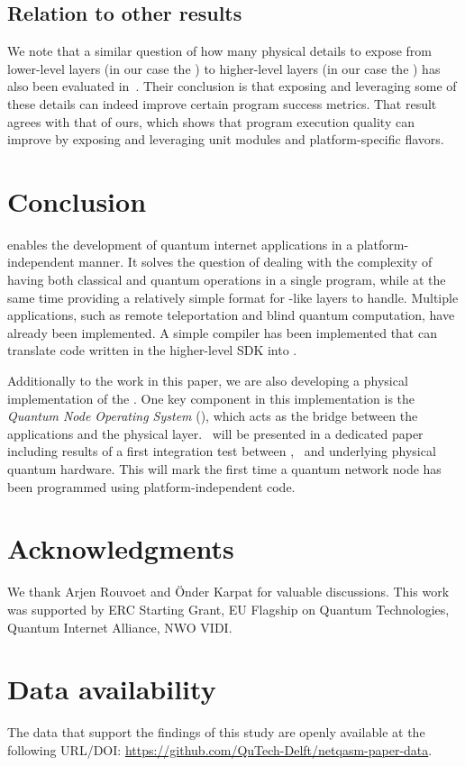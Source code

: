 \subsection{Relation to other results}
We note that a similar question of how many physical details to expose from lower-level layers (in our case the \QNPU) to higher-level layers (in our case the \host) has also been evaluated in~\cite{murali2019fullstack}.
Their conclusion is that exposing and leveraging some of these details can indeed improve certain program success metrics.
That result agrees with that of ours, which shows that program execution quality can improve by exposing and leveraging unit modules and platform-specific \netqasm flavors.

\section{Conclusion}
\label{sec:conclusion}
\netqasm enables the development of quantum internet applications in a platform-independent manner.
It solves the question of dealing with the complexity of having both classical and quantum operations in a single program, while at the same time providing a relatively simple format for \QNPU-like layers to handle.
Multiple applications, such as remote teleportation and blind quantum computation, have already been implemented.
A simple compiler has been implemented that can translate code written in the higher-level SDK into \netqasm.

Additionally to the work in this paper, we are also developing a physical implementation of the \QNPU.
One key component in this implementation is the \emph{Quantum Node Operating System} (\qnodeos), which acts as the bridge between the applications and the physical layer.
\qnodeos\ will be presented in a dedicated paper including results of a first integration test between \netqasm, \qnodeos\ and underlying physical quantum hardware.
This will mark the first time a quantum network node has been programmed using platform-independent code.


\section{Acknowledgments}
We thank Arjen Rouvoet and \"Onder Karpat for valuable discussions.
This work was supported by ERC Starting Grant, EU Flagship on Quantum Technologies, Quantum Internet Alliance, NWO VIDI.


\section{Data availability}
The data that support the findings of this study are openly available at the following URL/DOI: \url{https://github.com/QuTech-Delft/netqasm-paper-data}.

